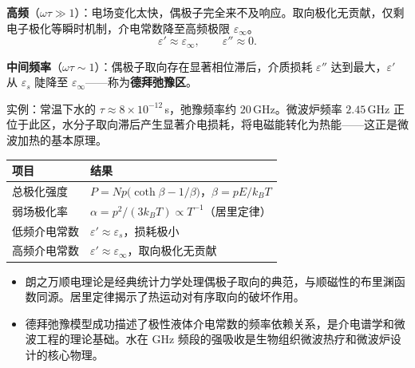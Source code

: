 \begin{derivationbox}[标准解题过程]
\textbf{高频}（$\omega\tau\gg1$）：电场变化太快，偶极子完全来不及响应。取向极化无贡献，仅剩电子极化等瞬时机制，介电常数降至高频极限 $\varepsilon_\infty$。
\begin{equation}
\varepsilon'\approx\varepsilon_\infty,\qquad\varepsilon''\approx0.
\end{equation}

\textbf{中间频率}（$\omega\tau\sim1$）：偶极子取向存在显著相位滞后，介质损耗 $\varepsilon''$ 达到最大，$\varepsilon'$ 从 $\varepsilon_s$ 陡降至 $\varepsilon_\infty$——称为\textbf{德拜弛豫区}。

实例：常温下水的 $\tau\approx8\times10^{-12}\,$s，弛豫频率约 $20\,$GHz。微波炉频率 $2.45\,$GHz 正位于此区，水分子取向滞后产生显著介电损耗，将电磁能转化为热能——这正是微波加热的基本原理。
\end{derivationbox}

\begin{formulabox}[答案汇总]
\begin{center}
\begin{tabular}{ll}
\toprule
\textbf{项目} & \textbf{结果} \\
\midrule
总极化强度 & $P=Np\bigl(\coth\beta-1/\beta\bigr)$，$\beta=pE/k_BT$ \\
弱场极化率 & $\alpha=p^2/(3k_BT)\propto T^{-1}$（居里定律） \\
低频介电常数 & $\varepsilon'\approx\varepsilon_s$，损耗极小 \\
高频介电常数 & $\varepsilon'\approx\varepsilon_\infty$，取向极化无贡献 \\
\bottomrule
\end{tabular}
\end{center}
\end{formulabox}

\begin{insightbox}[物理图像]
\begin{itemize}
    \item 朗之万顺电理论是经典统计力学处理偶极子取向的典范，与顺磁性的布里渊函数同源。居里定律揭示了热运动对有序取向的破坏作用。
    \item 德拜弛豫模型成功描述了极性液体介电常数的频率依赖关系，是介电谱学和微波工程的理论基础。水在 GHz 频段的强吸收是生物组织微波热疗和微波炉设计的核心物理。
\end{itemize}
\end{insightbox}
